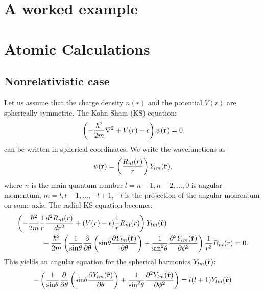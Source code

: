 \documentclass[12pt]{article}
\def\r{{\bf r}}
\begin{document}
\section{A worked example}

\appendix

\section{Atomic Calculations}

\subsection{Nonrelativistic case}

Let us assume that the charge density $n(r)$ and the potential $V(r)$
are spherically symmetric. The Kohn-Sham (KS) equation:
\begin{equation}
\left(-{\hbar^2\over 2m}\nabla^2 + V(r)-\epsilon\right) \psi(\r)=0
\end{equation}
can be written in spherical coordinates. We write the wavefunctions as
\begin{equation}
\psi(\r)=\left({R_{nl}(r)\over r}\right)Y_{lm}(\hat\r),
\end{equation}
where $n$ is the main quantum 
number $l=n-1,n-2,\dots,0$ is angular momentum, $m=l,l-1,\dots,-l+1,-l$
is the projection of the angular momentum on some axis. 
The radial KS equation becomes:
\begin{eqnarray}
\left(-{\hbar^2\over 2m} {1\over r} {d^2 R_{nl}(r)\over dr^2}
      +(V(r)-\epsilon) {1\over r} R_{nl}(r)
\right) Y_{lm}(\hat\r) \hskip 4cm \nonumber \\ \mbox{} - 
{\hbar^2\over 2m} \left({1\over\mbox{sin}\theta}{\partial\over\partial\theta}
                        \left(\mbox{sin}\theta{\partial Y_{lm}(\hat\r)
                                               \over\partial\theta}\right)
                      + {1\over\mbox{sin}^2\theta}
                           {\partial^2Y_{lm}(\hat\r)\over\partial\phi^2}
                  \right) {1\over r^3} R_{nl}(r) = 0.
\end{eqnarray}
This yields an angular equation for the spherical harmonics $Y_{lm}(\hat\r)$:
\begin{equation}
-\left({1\over\mbox{sin}\theta}{\partial\over\partial\theta}
       \left(\mbox{sin}\theta{\partial Y_{lm}(\hat\r)\over\partial\theta}
       \right)
     + {1\over\mbox{sin}^2\theta}
                           {\partial^2Y_{lm}(\hat\r)\over\partial\phi^2}
\right) = l(l+1)Y_{lm}(\hat\r)
\end{equation}
\end{document}
